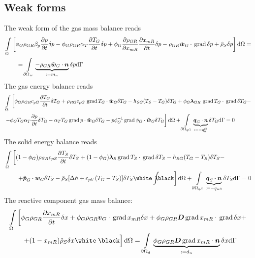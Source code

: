 \subsection{Weak forms}
The weak form of the gas mass balance reads
\begin{align}
	&\int \limits_\Omega \left[ \phi_G \rho_{GR} \beta_p \frac{\partial {p}}{\partial t} \delta p - \phi_G \rho_{GR} \alpha_T \frac{\partial {T_G}}{\partial t} \delta p + \phi_G \frac{\partial \rho_{GR}}{\partial x_{mR}} \frac{\partial x_{mR}}{\partial t} \delta p - \rho_{GR} \tilde{\mbox{${\mbox{\boldmath${w}$\unboldmath}}$}}_G \cdot \,\mathrm{grad}\, \delta p + \hat{\rho}_S \delta p \right] \mathrm{d} \Omega =\nonumber\\
	&\qquad =\int \limits_{\partial \Omega_w} \underbrace{- \rho_{GR} \tilde{\mbox{${\mbox{\boldmath${w}$\unboldmath}}$}}_{G} \cdot \mbox{${\mbox{\boldmath${n}$\unboldmath}}$}}_{:= \dot{m}_n} \delta p \mathrm{d} \Gamma
\end{align}
The gas energy balance reads
\begin{align}
	&\int \limits_\Omega \left[ \phi_G \rho_{GR} c_{pG} \frac{\partial T_G}{\partial t} \delta T_G + \rho_{RG} c_{pG}\,\,\mathrm{grad}\, T_G \cdot \tilde{\mbox{${\mbox{\boldmath${w}$\unboldmath}}$}}_G \delta T_G - h_{SG} (T_S - T_G) \delta T_G + \phi_G\mbox{${\mbox{\boldmath${\lambda}$\unboldmath}}$}_{GR}\, \,\mathrm{grad}\, T_G \cdot \,\mathrm{grad}\, \delta T_G - \right.\nonumber\\
	& \left. - \phi_G T_G \alpha_T \frac{\partial p}{\partial t} \delta T_G - \alpha_T T_G \,\mathrm{grad}\, p \cdot \tilde{\mbox{${\mbox{\boldmath${w}$\unboldmath}}$}}_G  \delta T_G - p \phi_G^{-1} \,\mathrm{grad}\, \phi_G \cdot \tilde{\mbox{${\mbox{\boldmath${w}$\unboldmath}}$}}_G \delta T_G \right] \mathrm{d} \Omega + \int \limits_{\partial \Omega_{qG}} \underbrace{\mbox{${\mbox{\boldmath${q}$\unboldmath}}$}_G \cdot \mbox{${\mbox{\boldmath${n}$\unboldmath}}$}}_{:= - q_n^G} \delta T_G \mathrm{d} \Gamma= 0
\end{align}
The solid energy balance reads
\begin{align}
	&\int \limits_\Omega \left[ (1-\phi_{G}) \rho_{SR} c_{pS} \frac{\partial T_S}{\partial t} \delta T_S + (1-\phi_{G}) \mbf{\lambda}_S \grad T_S \cdot \grad \delta T_S - h_{SG} (T_G - T_S) \delta T_S - \right. \nn\\
	&\qquad \left. + \hat{\mbf{p}}_G \cdot \mbf{w}_G \delta T_S - \hat{\rho}_S [\Delta h + c_{pV} (T_G - T_S)] \delta T_S \white \int \hspace{-3mm} \black \right] \mathd \Omega + \int \limits_{\partial \Omega_{qS}} \underbrace{\mbf{q}_S \cdot \mbf{n}}_{:=-q_{nS}} \delta T_S \mathd \Gamma= 0
\end{align}
The reactive component gas mass balance:
\begin{align}
	&\int \limits_\Omega \left[ \phi_G \rho_{GR} \frac{\partial x_{mR}}{\partial t} \delta x + \phi_G \rho_{GR} \mbf{v}_G \cdot \grad x_{mR} \delta x + \phi_G \rho_{GR} \mbf{D} \grad x_{mR} \cdot \grad \delta x + \right. \nn\\
		&\qquad  \left. + (1 - x_{mR}) \hat{\rho}_S \delta x \white \frac{}{} \black \right] \mathd \Omega = \int \limits_{\partial \Omega_{d}} \underbrace{\phi_G \rho_{GR}  \mbf{D} \grad x_{mR} \cdot \mbf{n}}_{:=d_n} \delta x \mathd \Gamma
\end{align}

